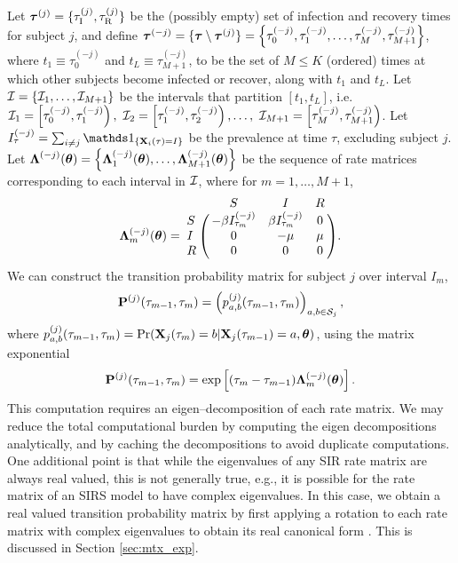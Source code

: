 Let $ \boldsymbol{\tau}^{(j)} = \lbrace \tau_\mathrm{I}^{(j)},\tau_\mathrm{R}^{(j)}\rbrace $ be the (possibly empty) set of infection and recovery times for subject $ j $, and define $ \boldsymbol{\tau}^{(-j)} = \lbrace\boldsymbol{\tau}\setminus\boldsymbol{\tau}^{(j)}\rbrace = \left \lbrace \tau_0^{(-j)} ,\tau_1^{(-j)}, \dots, \tau_{M}^{(-j)}, \tau_{M+1}^{(-j)}\right \rbrace$, where $ t_1 \equiv \tau_0^{(-j)} $ and $ t_L\equiv\tau_{M+1}^{(-j)} $, to be the set of $ M\leq K $ (ordered) times at which other subjects become infected or recover, along with $ t_1$ and $ t_L $. Let $ \mathcal{I} = \lbrace \mathcal{I}_1, \dots,\mathcal{I}_{M+1}\rbrace $ be the intervals that partition $ [t_1,t_L]$, i.e. $ \mathcal{I}_1 = \left [\tau_0^{(-j)},\tau_1^{(-j)}\right ),\ \mathcal{I}_2=\left [\tau_1^{(-j)},\tau_2^{(-j)}\right ),\dots,\ \mathcal{I}_{M+1}=\left [\tau_{M}^{(-j)},\tau_{M+1}^{(-j)}\right )$. Let $ I_\tau^{(-j)} = \sum_{i\neq j}\ind{\bX_i(\tau) = I} $ be the prevalence at time $ \tau $, excluding subject $ j $. Let $ \boldsymbol{\Lambda}^{(-j)}(\boldsymbol{\theta}) = \left \lbrace\boldsymbol{\Lambda}_1^{(-j)}(\boldsymbol{\theta}),\dots,\boldsymbol{\Lambda}_{M+1}^{(-j)}(\boldsymbol{\theta}) \right \rbrace$ be the sequence of rate matrices corresponding to each interval in $ \mathcal{I} $, where for $ m=1,\dots,M+1 $,
\begin{equation} \bLambda_m^{(-j)}(\btheta) = \bordermatrix{ & S & I & R \cr
	S & -\beta I_{\tau_m}^{(-j)} & \beta I_{\tau_m}^{(-j)} & 0 \cr 
	I & 0 & -\mu & \mu \cr
	R & 0 & 0 & 0 }.
\end{equation}
We can construct the transition probability matrix for subject $ j $ over interval $ I_m $, $$ \mathbf{P}^{(j)}(\tau_{m-1},\tau_m) = \left (
p_{a,b}^{(j)}(\tau_{m-1},\tau_m)\right )_{a,b\in \mathcal{S}_j}, $$ where $ p_{a,b}^{(j)}(\tau_{m-1},\tau_m) = \Pr(\mathbf{X}_j(\tau_m)=b|\mathbf{X}_j(\tau_{m-1})=a, \boldsymbol{\theta}) $, using the matrix exponential $$
	\mathbf{P}^{(j)} (\tau_{m-1},\tau_m)= \exp\left [(\tau_m - \tau_{m-1})\boldsymbol{\Lambda}^{(-j)}_m(\boldsymbol{\theta})\right ].
	$$
This computation requires an eigen--decomposition of each rate matrix. We may reduce the total computational burden by computing the eigen decompositions analytically, and by caching the decompositions to avoid duplicate computations. One additional point is that while the eigenvalues of any SIR rate matrix are always real valued, this is not generally true, e.g., it is possible for the rate matrix of an SIRS model to have complex eigenvalues. In this case, we obtain a real valued transition probability matrix by first applying a rotation to each rate matrix with complex eigenvalues to obtain its real canonical form \cite{hirsch2013differential}. This is discussed in Section \ref{sec:mtx_exp}.

